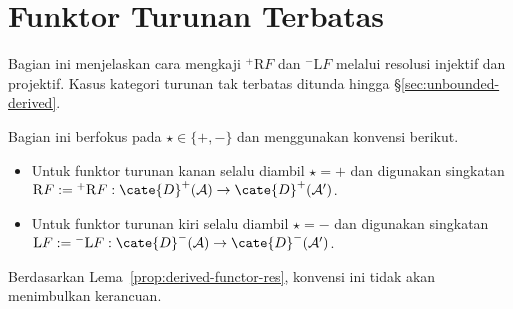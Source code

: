 
\section{Funktor Turunan Terbatas}\label{sec:bounded-derived-functor}
\hypertarget{o014.aljabr2.chapter4.bounded-derived-functors}{ }

Bagian ini menjelaskan cara mengkaji ${}^+\mathrm{R}F$ dan
${}^-\mathrm{L}F$ melalui resolusi injektif dan projektif. Kasus kategori
turunan tak terbatas ditunda hingga \S\ref{sec:unbounded-derived}.

\begin{konvensi}
	Bagian ini berfokus pada $\star\in\{+,-\}$ dan menggunakan konvensi berikut.
	\begin{itemize}
		\item Untuk funktor turunan kanan selalu diambil $\star=+$ dan digunakan
		singkatan
		$\mathrm{R}F:={}^+\mathrm{R}F:
		\cate{D}^+(\mathcal{A})\to\cate{D}^+(\mathcal{A}')$.
		\item Untuk funktor turunan kiri selalu diambil $\star=-$ dan digunakan
		singkatan
		$\mathrm{L}F:={}^-\mathrm{L}F:
		\cate{D}^-(\mathcal{A})\to\cate{D}^-(\mathcal{A}')$.
	\end{itemize}
	Berdasarkan Lema~\ref{prop:derived-functor-res}, konvensi ini tidak akan
	menimbulkan kerancuan.
\end{konvensi}

